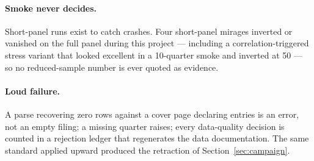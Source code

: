 \paragraph{Smoke never decides.}
Short-panel runs exist to catch crashes. Four short-panel mirages
inverted or vanished on the full panel during this project ---
including a correlation-triggered stress variant that looked
excellent in a 10-quarter smoke and inverted at 50 --- so no
reduced-sample number is ever quoted as evidence.

\paragraph{Loud failure.}
A parse recovering zero rows against a cover page declaring entries
is an error, not an empty filing; a missing quarter raises; every
data-quality decision is counted in a rejection ledger that
regenerates the data documentation. The same standard applied upward
produced the retraction of Section~\ref{sec:campaign}.
